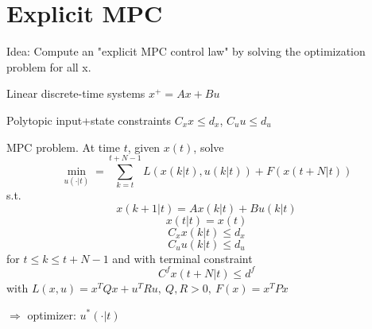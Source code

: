 \section{Explicit MPC}

Idea: Compute an "explicit MPC control law" by solving the optimization problem for all x.

Linear discrete-time systems $x^+=Ax+Bu$

Polytopic input+state constraints $C_xx \leq d_x$,  $C_uu \leq d_u$

MPC problem. At time $t$, given $x(t)$, solve
\begin{equation*}
\min_{u(\cdot|t)} = \sum_{k=t}^{t+N-1}L(x(k|t),u(k|t)) + F(x(t+N|t))
\end{equation*}
s.t.
\begin{equation*}
x(k+1|t) = Ax(k|t) + Bu(k|t)
\end{equation*}
\begin{equation*}
x(t|t) = x(t)
\end{equation*}
\begin{equation*}
C_xx(k|t) \leq d_x
\end{equation*}
\begin{equation*}
C_uu(k|t) \leq d_u
\end{equation*}
for $ t \leq k \leq t+N-1$ and with terminal constraint
\begin{equation*}
C^fx(t+N|t) \leq d^f
\end{equation*}
with $L(x,u) = x^TQx + u^TRu, \ Q,R > 0, \ F(x) = x^TPx$

$\Rightarrow$ optimizer: $u^*(\cdot|t)$

